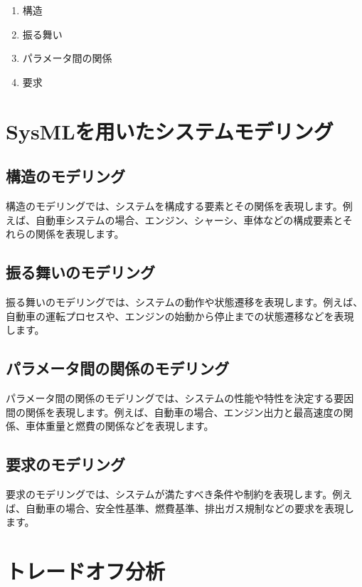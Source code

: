 \begin{enumerate}
    \item 構造
    \item 振る舞い
    \item パラメータ間の関係
    \item 要求
\end{enumerate}

\section{SysMLを用いたシステムモデリング}

\subsection{構造のモデリング}

構造のモデリングでは、システムを構成する要素とその関係を表現します。例
えば、自動車システムの場合、エンジン、シャーシ、車体などの構成要素とそ
れらの関係を表現します。

\subsection{振る舞いのモデリング}

振る舞いのモデリングでは、システムの動作や状態遷移を表現します。例えば、
自動車の運転プロセスや、エンジンの始動から停止までの状態遷移などを表現
します。

\subsection{パラメータ間の関係のモデリング}

パラメータ間の関係のモデリングでは、システムの性能や特性を決定する要因
間の関係を表現します。例えば、自動車の場合、エンジン出力と最高速度の関
係、車体重量と燃費の関係などを表現します。

\subsection{要求のモデリング}

要求のモデリングでは、システムが満たすべき条件や制約を表現します。例え
ば、自動車の場合、安全性基準、燃費基準、排出ガス規制などの要求を表現し
ます。

\section{トレードオフ分析}

